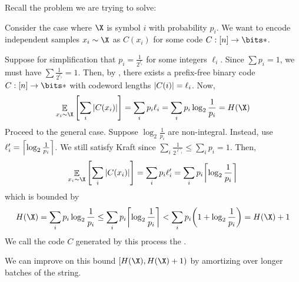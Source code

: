 \documentclass[class=co432,notes,tikz]{agony}
\DeclareMathOperator*{\E}{\mathbb{E}}
\begin{document}
Recall the problem we are trying to solve:
\bitproblem*
\begin{sol}
  Consider the case where $\X$ is symbol $i$ with probability $p_i$.
  We want to encode independent samples $x_i \sim \X$
  as $C(x_i)$ for some code $C : [n] \to \bits*$.

  Suppose for simplification that $p_i = \frac{1}{2^{\ell_i}}$
  for some integers $\ell_i$.
  Since $\sum p_i = 1$, we must have $\sum \frac{1}{2^{\ell_i}} = 1$.
  Then, by , there exists a prefix-free binary code
  $C : [n] \to \bits*$ with codeword lengths $\abs{C(i)} = \ell_i$.
  Now,
  \[
    \E_{x_i \sim \X}\qty[\sum_i\abs{C(x_i)}] = \sum_i p_i\ell_i = \sum_i p_i\log_2\frac{1}{p_i} = H(\X)
  \]
  Proceed to the general case.
  Suppose $\log_2\frac{1}{p_i}$ are non-integral.
  Instead, use $\ell'_i = \ceil*{\log_2\frac{1}{p_i}}$.
  We still satisfy Kraft since $\sum_i \frac{1}{2^{\ell'_i}} \leq \sum_i p_i = 1$.
  Then,
  \[
    \E_{x_i \sim \X}\qty[\sum_i\abs{C(x_i)}] = \sum_i p_i\ell'_i = \sum_i p_i\ceil*{\log_2\frac{1}{p_i}}
  \]
  which is bounded by
  \[ H(\X) = \sum_i p_i\log_2\frac{1}{p_i} \leq \sum_i p_i\ceil*{\log_2\frac{1}{p_i}} < \sum_i p_i\qty(1+\log_2\frac{1}{p_i}) = H(\X) + 1 \]
  We call the code $C$ generated by this process the .
\end{sol}

We can improve on this bound $[H(\X), H(\X) + 1)$
by amortizing over longer batches of the string.
\end{document}
